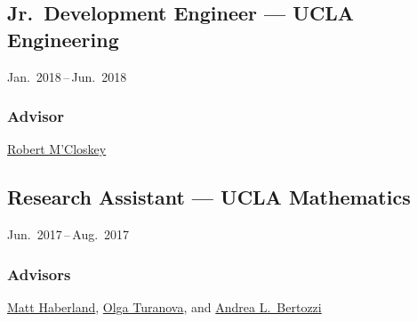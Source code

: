 \documentclass[11pt]{article}
\newcommand{\subsectionskip}{\baselineskip}	%
\newcommand{\cvdates}[2]{\hfill#1\,--\,#2}	%
\begin{document}
	\vspace*{\subsectionskip}
	
	\subsection{Jr.\ Development Engineer --- UCLA Engineering}
	\cvdates{Jan.\ 2018}{Jun.\ 2018}
	
	\subsubsection{Advisor}
	\href{http://www.seas.ucla.edu/mcloskey/}{Robert M'Closkey}
	
	\vspace*{\subsectionskip}
	
	\subsection{Research Assistant --- UCLA Mathematics}
	\cvdates{Jun.\ 2017}{Aug.\ 2017}
	
	\subsubsection{Advisors}
	\href{https://brae.calpoly.edu/faculty-and-staff-haberland}{Matt Haberland}, \href{https://sites.google.com/msu.edu/turanova/home}{Olga Turanova}, and \href{http://www.math.ucla.edu/~bertozzi/}{Andrea L.\ Bertozzi}

\end{document}
